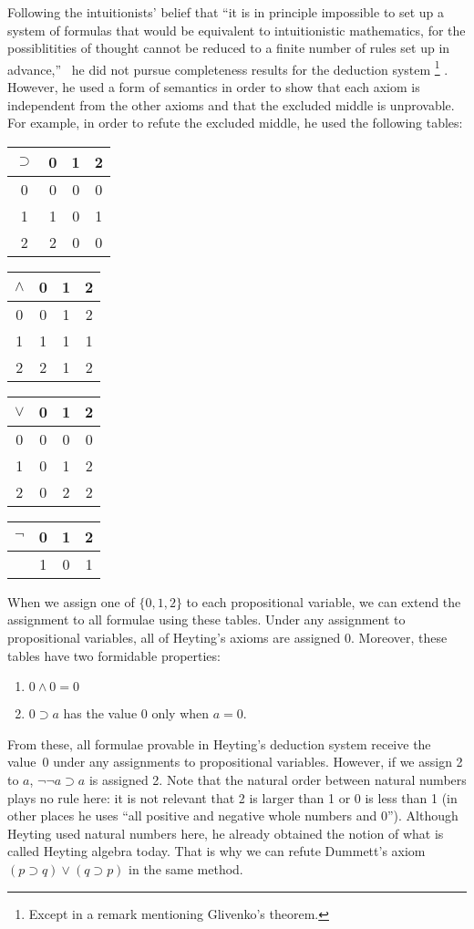 Following the intuitionists' belief
that ``it is in principle impossible to set up a system of formulas that
would be equivalent to intuitionistic mathematics, for the
possiblitities of thought cannot be reduced to a finite number of rules
set up in advance,''~\citep{heyting1930} he did not pursue completeness
results for the
deduction system%
\footnote{Except in a remark mentioning Glivenko's theorem.}%
.
However, he used a form of semantics in order to show that
each axiom is independent from the other axioms and that
the excluded middle is unprovable.
For example, in order to refute the excluded middle, he used the
following tables:\\
 \begin{center}
  \begin{tabular}{c|ccc}
   $\supset $& 0  & 1  & 2 \\ \hline
   0 & 0 & 0 & 0 \\
   1 & 1 & 0 & 1 \\
   2 & 2 & 0 & 0
  \end{tabular}
  \hfill
  \begin{tabular}{c|ccc}
   $\wedge $& 0 & 1& 2\\ \hline
   0 & 0 & 1 & 2\\
   1 & 1 & 1 & 1\\
   2 & 2 & 1 & 2\\
  \end{tabular}
  \hfill
  \begin{tabular}{c|ccc}
   $\vee$& 0 & 1 & 2\\ \hline
   0 & 0 & 0 & 0 \\
   1 & 0 & 1 & 2 \\
   2 & 0 & 2 & 2\\
  \end{tabular}
  \hfill
  \begin{tabular}{c|ccc}
   $\neg $& 0 & 1 & 2\\ \hline
   & 1 & 0 & 1\\
  \end{tabular}
 \end{center}
When we assign one of $\{0,1,2\}$ to each propositional variable, we
can extend the assignment to all formulae using these tables.
Under any assignment to propositional variables, all of Heyting's axioms
are assigned 0.  Moreover, these tables have two formidable properties:
\begin{enumerate}
 \item $0\land 0 = 0$
 \item $0\supset a$ has the value 0 only when $a = 0$.
\end{enumerate}
From these, all formulae provable in Heyting's deduction system
receive the value~0 under any assignments to propositional variables.
However, if we assign 2 to $a$, $\neg \neg a\supset a$
is assigned 2.  Note that the natural order between natural numbers
plays no rule here: it is not relevant that 2 is larger than 1 or 0 is
less than 1 (in other places he uses ``all positive and negative
whole numbers and 0'').  Although Heyting used natural numbers here, he
already obtained the notion of what is called Heyting algebra today.
That is why we can refute Dummett's
axiom $(p\supset q)\lor (q\supset p)$ in the same method.

